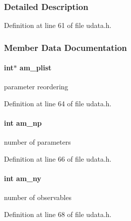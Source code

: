 \subsubsection{Detailed Description}


Definition at line 61 of file udata.\+h.



\subsubsection{Member Data Documentation}
\hypertarget{struct_user_data_a122fcb4f213656e29d30e1e8713fcf1c}{}
\paragraph[{am\+\_\+plist}]{\setlength{\rightskip}{0pt plus 5cm}int$\ast$ am\+\_\+plist}\label{struct_user_data_a122fcb4f213656e29d30e1e8713fcf1c}
parameter reordering 

Definition at line 64 of file udata.\+h.

\hypertarget{struct_user_data_a1b32993ff88dfae4dd2aab311c24cc26}{}
\paragraph[{am\+\_\+np}]{\setlength{\rightskip}{0pt plus 5cm}int am\+\_\+np}\label{struct_user_data_a1b32993ff88dfae4dd2aab311c24cc26}
number of parameters 

Definition at line 66 of file udata.\+h.

\hypertarget{struct_user_data_a1c8d4eb301c60c34dc4870faca7ce5a4}{}
\paragraph[{am\+\_\+ny}]{\setlength{\rightskip}{0pt plus 5cm}int am\+\_\+ny}\label{struct_user_data_a1c8d4eb301c60c34dc4870faca7ce5a4}
number of observables 

Definition at line 68 of file udata.\+h.

\hypertarget{struct_user_data_a00ba9cf99f8f02b663241bb76b76ce96}{}

